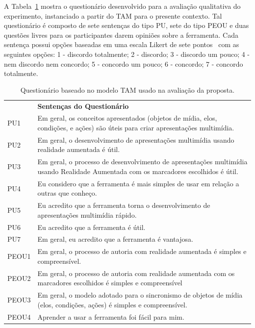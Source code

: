 \documentclass[../main.tex]{subfiles}
\begin{document}
A Tabela~\ref{tab:tam_sentencas} mostra o questionário desenvolvido para a avaliação qualitativa do experimento, instanciado a partir do TAM para o presente contexto. Tal questionário é composto de sete sentenças do tipo PU, sete do tipo PEOU e duas questões livres para os participantes darem opiniões sobre a ferramenta. Cada sentença possui opções baseadas em uma escala Likert de sete pontos~\cite{vagias2006likert} com as seguintes opções: 1 - discordo totalmente; 2 - discordo; 3 - discordo um pouco; 4 - nem discordo nem concordo; 5 - concordo um pouco; 6 - concordo; 7 - concordo totalmente.

\begin{table}[htpb]
\caption{Questionário baseado no modelo TAM usado na avaliação da proposta.}
\label{tab:tam_sentencas}
\begin{tabularx}{.95\linewidth}{m{1.3cm} X}
\toprule
 & \textbf{\centering Sentenças do Questionário}
\\\otoprule
PU1 & Em geral, os conceitos apresentados (objetos de mídia, elos, condições, e ações) são úteis para criar apresentações multimídia.
\\\midrule
PU2 & Em geral, o desenvolvimento de apresentações multimídia usando realidade aumentada é útil.
\\\midrule
PU3 & Em geral, o processo de desenvolvimento de apresentações multimídia usando Realidade Aumentada com os marcadores escolhidos é útil.
\\\midrule
PU4 & Eu considero que a ferramenta é mais simples de usar em relação a outras que conheço.
\\\midrule
PU5 & Eu acredito que a ferramenta torna o desenvolvimento de apresentações multimídia rápido.
\\\midrule
PU6 & Eu acredito que a ferramenta é útil.
\\\midrule
PU7 & Em geral, eu acredito que a ferramenta é vantajosa.
\\\midrule
PEOU1 & Em geral, o processo de autoria com realidade aumentada é simples e compreensível.
\\\midrule
PEOU2 & Em geral, o processo de autoria com realidade aumentada com os marcadores escolhidos é simples e compreensível
\\\midrule
PEOU3 & Em geral, o modelo adotado para o sincronismo de objetos de mídia (elos, condições, ações) é simples e compreensível.
\\\midrule
PEOU4 & Aprender a usar a ferramenta foi fácil para mim.
\\\midrule

\end{tabularx}
\end{table}
\end{document}
